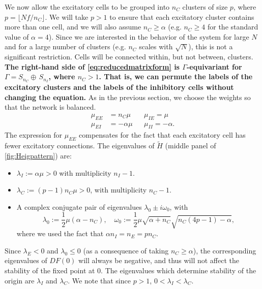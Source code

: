 \documentclass[reqno]{siamonline190516}
\newcommand{\revised}[1]{ \textbf{#1} }
\begin{document}
We now allow the excitatory cells to be grouped into $n_C$ clusters of size $p$, where $p = \lfloor N f/n_C \rfloor$. We will take $p > 1$ to ensure that each excitatory cluster contains more than one cell, and we will also assume $n_C \geq \alpha$ (e.g. $n_C \geq 4$ for the standard value of $\alpha = 4$). Since we are interested in the behavior of the system for large $N$ and for a large number of clusters (e.g. $n_C$ scales with $\sqrt{N}$), this is not a significant restriction. Cells will be connected within, but not between, clusters. 
\revised{
The right-hand side of \cref{eq:reducedmatrixform} is $\Gamma$-equivariant for $\Gamma = S_{n_C} \oplus \, S_{n_I}$, where $n_C > 1$. That is, we can permute the labels of the excitatory clusters and the labels of the inhibitory cells without changing the equation.
}
As in the previous section, we choose the weights so that the network is balanced. 
\begin{align*}
\mu_{EE} &= n_C \mu && \mu_{IE} = \mu \\
\mu_{EI} &= -\alpha \mu && \mu_{II} = -\alpha.
\end{align*}
The expression for $\mu_{EE}$ compensates for the fact that each excitatory cell has fewer excitatory connections. The eigenvalues of \revised{$\tilde{H}$} (middle panel of \cref{fig:Heigpattern}) are:
\begin{itemize}
\item $\lambda_I := \alpha \mu > 0$ with multiplicity $n_I - 1$.
\item $\lambda_C := (p-1) n_C \mu > 0$, with multiplicity $n_C - 1$.
\item A complex conjugate pair of eigenvalues $\lambda_0 \pm i \omega_0$, with 
\begin{equation*}
    \lambda_0 := \frac{1}{2}\mu(\alpha - n_C), \quad 
    \omega_0 := \frac{1}{2}\mu \sqrt{ \alpha + n_C} \sqrt{ n_C(4 p - 1) - \alpha },
\end{equation*}
where we used the fact that $\alpha n_I = n_E = p n_C$.
\end{itemize}
Since $\lambda_E < 0$ and $\lambda_0 \leq 0$ (as a consequence of taking $n_C \geq \alpha$), the corresponding eigenvalues of $DF(0)$ will always be negative, and thus will not affect the stability of the fixed point at 0. The eigenvalues which determine stability of the origin are $\lambda_I$ and $\lambda_C$. We note that since $p > 1$, $0 < \lambda_I < \lambda_C$.
\end{document}
